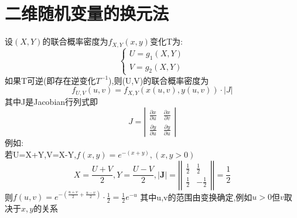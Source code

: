 \documentclass[12pt, a4paper, oneside, UTF8]{ctexbook}
\begin{document}
\section{二维随机变量的换元法}
设$(X,Y)$的联合概率密度为$f_{X,Y}(x,y)$变化T为:
\[
\begin{cases}
    U=g_1(X,Y) \\
    V=g_2(X,Y)
\end{cases}
\]
如果T可逆(即存在逆变化$T^{-1}$),则(U,V)的联合概率密度为
\[
f_{U,V}(u,v)=f_{X,Y}(x(u,v),y(u,v))\cdot \left|J\right|
\]
其中J是Jacobian行列式即
\[
J=\left|\begin{array}{cc}
    \frac{\partial x}{\partial u} & \frac{\partial x}{\partial v} \\
    \frac{\partial y}{\partial u} & \frac{\partial y}{\partial u}
\end{array}\right|
\]
例如: \\
    若U=X+Y,V=X-Y,$f(x,y)=e^{-(x+y)},(x,y > 0)$
    \[
    X=\frac{U+V}{2}, Y=\frac{U-V}{2},\left|\mathbf{J}\right|=\left|\left|\begin{array}{cc}
        \frac{1}{2} & \frac{1}{2} \\
        \frac{1}{2} & -\frac{1}{2}
    \end{array}\right|\right| = \frac{1}{2}
    \]
    则$f(u,v)=e^{-(\frac{u+v}{2}+\frac{u-v}{2})}\cdot\frac{1}{2}=\frac{1}{2}e^{-u}$
    其中u,v的范围由变换确定,例如$u>0$但$v$取决于$x,y$的关系
\end{document}
